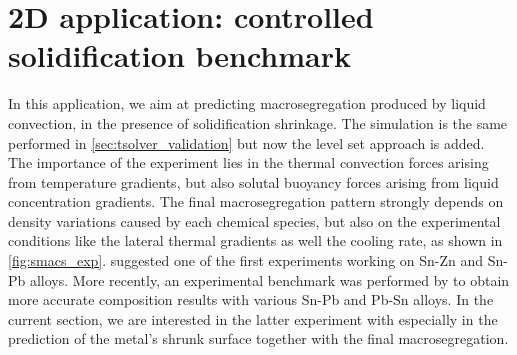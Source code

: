 \section{2D application: controlled solidification benchmark}
In this application, we aim at predicting macrosegregation produced by liquid convection, in the presence of solidification shrinkage.
The simulation is the same performed in \cref{sec:tsolver_validation} but now the level set approach is added.
The importance of the experiment lies in the 
thermal convection forces arising from temperature gradients, but also solutal buoyancy forces arising from liquid concentration gradients. The final macrosegregation pattern
strongly depends on density variations caused by each chemical species, but also on the experimental conditions like the lateral thermal gradients as well the cooling rate,
as shown in \cref{fig:smacs_exp}.
\citet{hebditch_observations_1974} suggested one of the first experiments working on Sn-Zn and Sn-Pb alloys. 
More recently, an experimental benchmark was performed by \citet{hachani_experimental_2012} to obtain more accurate 
composition results with various Sn-Pb and Pb-Sn alloys. In the current section, we are interested in the latter experiment with  especially in the prediction
of the metal's shrunk surface together with the final macrosegregation.


